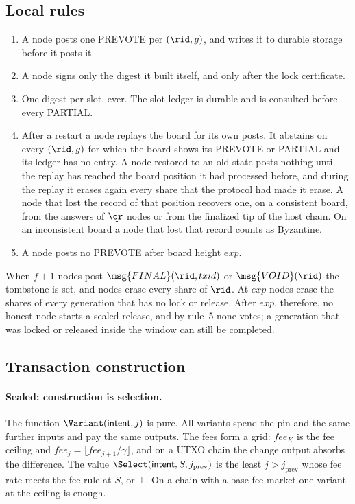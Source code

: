 \subsection{Local rules}\label{sec:rules}

\begin{enumerate}[leftmargin=1.7em,itemsep=1pt]
\item A node posts one PREVOTE per $(\rid, g)$, and writes it to durable storage before it posts it.
\item A node signs only the digest it built itself, and only after the lock certificate.
\item One digest per slot, ever. The slot ledger is durable and is consulted before every PARTIAL.
\item After a restart a node replays the board for its own posts. It abstains on every $(\rid, g)$ for which the board shows its PREVOTE or PARTIAL and its ledger has no entry. A node restored to an old state posts nothing until the replay has reached the board position it had processed before, and during the replay it erases again every share that the protocol had made it erase. A node that lost the record of that position recovers one, on a consistent board, from the answers of $\qr$ nodes or from the finalized tip of the host chain. On an inconsistent board a node that lost that record counts as Byzantine.
\item A node posts no PREVOTE after board height $exp$.
\end{enumerate}

When $f+1$ nodes post $\msg{FINAL}(\rid, txid)$ or $\msg{VOID}(\rid)$ the tombstone is set, and nodes erase every share of $\rid$. At $exp$ nodes erase the shares of every generation that has no lock or release. After $exp$, therefore, no honest node starts a sealed release, and by rule~5 none votes; a generation that was locked or released inside the window can still be completed.

\subsection{Transaction construction}\label{sec:tx}

\paragraph{Sealed: construction is selection.} The function $\Variant(\textsf{intent}, j)$ is pure. All variants spend the pin and the same further inputs and pay the same outputs. The fees form a grid: $fee_K$ is the fee ceiling and $fee_j = \lfloor fee_{j+1}/\gamma \rfloor$, and on a UTXO chain the change output absorbs the difference. The value $\Select(\textsf{intent}, S, j_{\mathrm{prev}})$ is the least $j > j_{\mathrm{prev}}$ whose fee rate meets the fee rule at $S$, or $\bot$. On a chain with a base-fee market one variant at the ceiling is enough.

